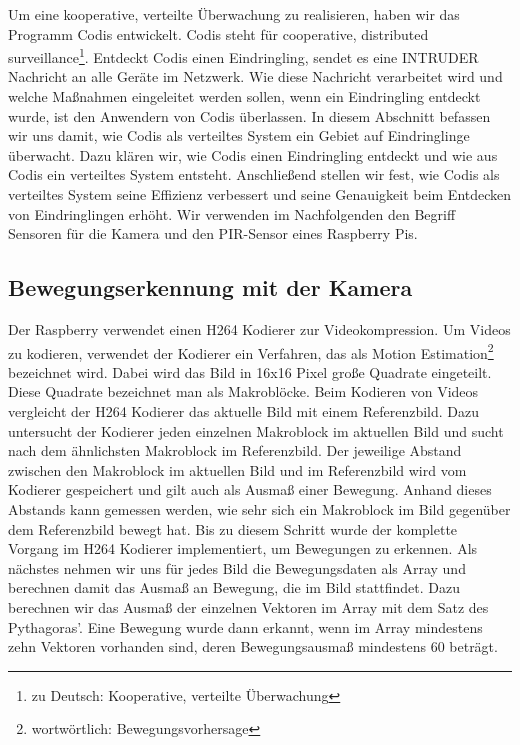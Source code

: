 \documentclass[journal]{IEEEtran}
\begin{document}
Um eine kooperative, verteilte Überwachung zu realisieren, haben wir das Programm Codis entwickelt. Codis steht für cooperative, distributed surveillance\footnote{zu Deutsch: Kooperative, verteilte Überwachung}. Entdeckt Codis einen Eindringling, sendet es eine \MakeUppercase{intruder} Nachricht an alle Geräte im Netzwerk. Wie diese Nachricht verarbeitet wird und welche Maßnahmen eingeleitet werden sollen, wenn ein Eindringling entdeckt wurde, ist den Anwendern von Codis überlassen. In diesem Abschnitt befassen wir uns damit, wie Codis als verteiltes System ein Gebiet auf Eindringlinge überwacht. Dazu klären wir, wie Codis einen Eindringling entdeckt und wie aus Codis ein verteiltes System entsteht. Anschließend stellen wir fest, wie Codis als verteiltes System seine Effizienz verbessert und seine Genauigkeit beim Entdecken von Eindringlingen erhöht. Wir verwenden im Nachfolgenden den Begriff Sensoren für die Kamera und den PIR-Sensor eines Raspberry Pis.

\subsection{Bewegungserkennung mit der Kamera}

Der Raspberry verwendet einen H264 Kodierer zur Videokompression. Um Videos zu kodieren, verwendet der Kodierer ein Verfahren, das als Motion Estimation\footnote{wortwörtlich: Bewegungsvorhersage}\cite{estimation} bezeichnet wird. Dabei wird das Bild in 16x16 Pixel große Quadrate eingeteilt. Diese Quadrate bezeichnet man als Makroblöcke. Beim Kodieren von Videos vergleicht der H264 Kodierer das aktuelle Bild mit einem Referenzbild. Dazu untersucht der Kodierer jeden einzelnen Makroblock im aktuellen Bild und sucht nach dem ähnlichsten Makroblock im Referenzbild. Der jeweilige Abstand zwischen den Makroblock im aktuellen Bild und im Referenzbild wird vom Kodierer gespeichert und gilt auch als Ausmaß einer Bewegung. Anhand dieses Abstands kann gemessen werden, wie sehr sich ein Makroblock im Bild gegenüber dem Referenzbild bewegt hat. Bis zu diesem Schritt wurde der komplette Vorgang im H264 Kodierer implementiert, um Bewegungen zu erkennen.\cite{vektoren} Als nächstes nehmen wir uns für jedes Bild die Bewegungsdaten als Array und berechnen damit das Ausmaß an Bewegung, die im Bild stattfindet. Dazu berechnen wir das Ausmaß der einzelnen Vektoren im Array mit dem Satz des Pythagoras'. Eine Bewegung wurde dann erkannt, wenn im Array mindestens zehn Vektoren vorhanden sind, deren Bewegungsausmaß mindestens 60 beträgt.\cite{motion2}
\end{document}
